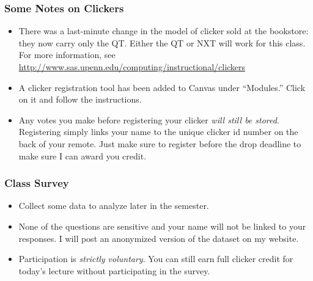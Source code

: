 \documentclass[handout]{beamer}
\date{Lecture \# 2}
\begin{document}
 





\begin{frame}[plain]
	\titlepage 
	

\end{frame} 
\begin{frame}
\frametitle{Some Notes on Clickers}

\begin{itemize}
	\item There was a last-minute change in the model of clicker sold at the bookstore: they now carry only the QT. Either the QT or NXT will work for this class. For more information, see
\url{http://www.sas.upenn.edu/computing/instructional/clickers}
	\item A clicker registration tool has been added to Canvas under ``Modules.'' Click on it and follow the instructions. 
	\item Any votes you make before registering your clicker \emph{will still be stored}. Registering simply links your name to the unique clicker id number on the back of your remote. \alert{Just make sure to register before the drop deadline to make sure I can award you credit.}
\end{itemize}



\end{frame}


\begin{frame}\frametitle{Class Survey}
 
\begin{itemize}
	\item Collect some data to analyze later in the semester.
	\item None of the questions are sensitive and your name will not be linked to your responses. I will post an anonymized version of the dataset on my website.
	\item Participation is  \emph{strictly voluntary}. You can still earn full clicker credit for today's lecture without participating in the survey.
\end{itemize}


\end{frame}
\end{document}
